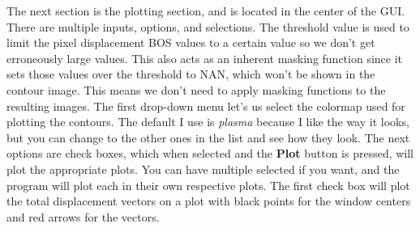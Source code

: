 \documentclass[letterpaper,12pt]{article}
\begin{document}
The next section is the plotting section, and is located in the center of the GUI.  There are multiple inputs, options, and selections.  The threshold value is used to limit the pixel displacement BOS values to a certain value so we don't get erroneously large values.  This also acts as an inherent masking function since it sets those values over the threshold to NAN, which won't be shown in the contour image.  This means we don't need to apply masking functions to the resulting images.  The first drop-down menu let's us select the colormap used for plotting the contours.  The default I use is \textit{plasma} because I like the way it looks, but you can change to the other ones in the list and see how they look.  The next options are check boxes, which when selected and the \textcolor{myBlue}{\textbf{Plot}} button is pressed, will plot the appropriate plots.  You can have multiple selected if you want, and the program will plot each in their own respective plots.  The first check box will plot the total displacement vectors on a plot with black points for the window centers and red arrows for the vectors.
\end{document}
